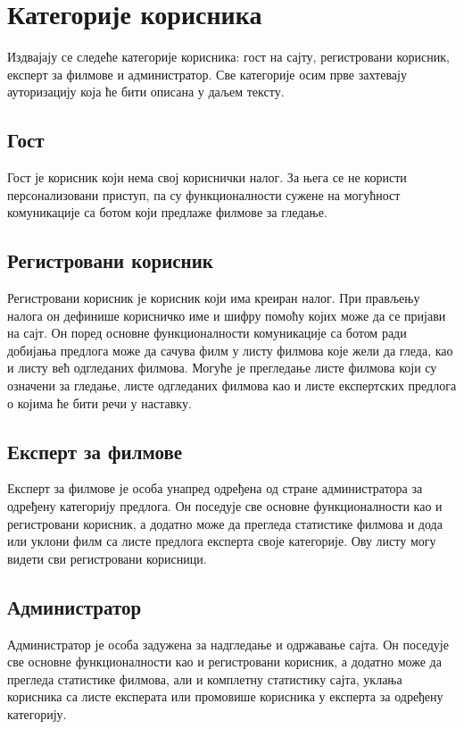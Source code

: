 \section{Категорије корисника}

Издвајају се следеће категорије корисника: гост на сајту, регистровани корисник, експерт за
филмове и администратор. Све категорије осим прве захтевају ауторизацију која ће бити описана
у даљем тексту.

\subsection{Гост}

Гост је корисник који нема свој кориснички налог. За њега се не користи персонализовани
приступ, па су функционалности сужене на могућност комуникације са ботом који предлаже филмове
за гледање.

\subsection{Регистровани корисник}

Регистровани корисник је корисник који има креиран налог. При прављењу налога он дефинише
корисничко име и шифру помоћу којих може да се пријави на сајт. Он поред основне функционалности
комуникације са ботом ради добијања предлога може да сачува филм у листу филмова које жели да
гледа, као и листу већ одгледаних филмова. Могуће је прегледање листе филмова који су означени
за гледање, листе одгледаних филмова као и листе експертских предлога о којима ће бити речи у
наставку.

\subsection{Експерт за филмове}

Експерт за филмове је особа унапред одређена од стране администратора за одређену категорију
предлога. Он поседује све основне функционалности као и регистровани корисник, а додатно може
да прегледа статистике филмова и дода или уклони филм са листе предлога експерта своје
категорије. Ову листу могу видети сви регистровани корисници.

\subsection{Администратор}

Администратор је особа задужена за надгледање и одржавање сајта. Он поседује све основне
функционалности као и регистровани корисник, а додатно може да прегледа статистике филмова,
али и комплетну статистику сајта, уклања корисника са листе експерата или промовише корисника
у експерта за одређену категорију.
